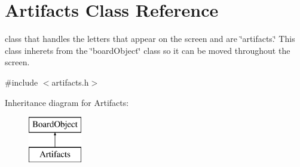 \hypertarget{class_artifacts}{}\section{Artifacts Class Reference}
\label{class_artifacts}


class that handles the letters that appear on the screen and are \char`\"{}artifacts.\char`\"{} This class inherets from the \char`\"{}board\+Object\char`\"{} class so it can be moved throughout the screen.  




{\ttfamily \#include $<$artifacts.\+h$>$}

Inheritance diagram for Artifacts\+:\begin{figure}[H]
\begin{center}
\leavevmode
\includegraphics[height=2.000000cm]{class_artifacts}
\end{center}
\end{figure}
